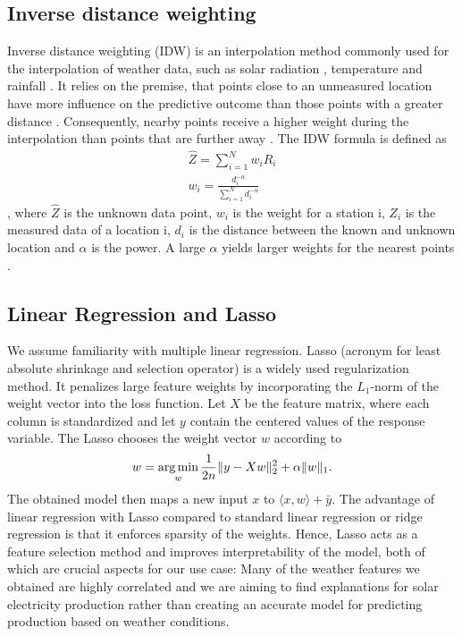\documentclass{article}
\begin{document}
\subsection{Inverse distance weighting}
Inverse distance weighting (IDW) is an interpolation method commonly used for the interpolation of weather data, such as solar radiation \cite{Loghmari2018} , temperature \cite{Cao2009}  and rainfall \cite{Chen2012}. 
It relies on the premise, that points close to an unmeasured location have more influence on the predictive outcome than those points with a greater distance \cite{Chen2012}. 
Consequently, nearby points receive a higher weight during the interpolation than points that are further away \cite{Lu2008}. 
The IDW formula is defined as
\begin{align}
    \hat{Z} = \sum_{i=1}^N w_iR_i \\
    w_i = \frac{d_i^{-\alpha}}{\sum_{i=1}^N{d_i^{-\alpha}}}
\end{align} \cite{Chen2012},
 where $\hat{Z}$ is the unknown data point, $w_i$ is the weight for a station i, $Z_i$ is the measured data of a location i, $d_i$ is the distance between the known and unknown location and $\alpha$ is the power. 
 A large $\alpha$ yields larger weights for the nearest points \cite{Lu2008}.

\subsection{Linear Regression and Lasso}
We assume familiarity with multiple linear regression. Lasso (acronym for least absolute shrinkage and selection operator) is a widely used regularization method. It penalizes large feature weights by incorporating the $L_1$-norm of the weight vector into the loss function. Let $X$ be the feature matrix, where each column is standardized and let $y$ contain the centered values of the response variable. The Lasso chooses the weight vector $w$ according to
\begin{equation*}
	w = \underset{w}{\text{arg\,min}} \, \frac{1}{2n} \|y - Xw\|_2^2 + \alpha \|w\|_1.
\end{equation*}
The obtained model then maps a new input $x$ to $\langle x,w \rangle + \bar{y}$. The advantage of linear regression with Lasso compared to standard linear regression or ridge regression is that it enforces sparsity of the weights. Hence, Lasso acts as a feature selection method and improves interpretability of the model, both of which are crucial aspects for our use case: Many of the weather features we obtained are highly correlated and we are aiming to find explanations for solar electricity production rather than creating an accurate model for predicting production based on weather conditions.
\end{document}
